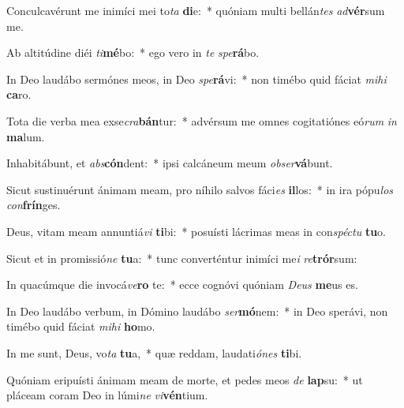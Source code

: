\item Conculcavérunt me inimíci mei to\textit{ta} \textbf{di}e:~* quóniam multi bellán\textit{tes} \textit{ad}\textbf{vér}sum me.
\item Ab altitúdine diéi \textit{ti}\textbf{mé}bo:~* ego vero in \textit{te} \textit{spe}\textbf{rá}bo.
\item In Deo laudábo sermónes meos, in Deo \textit{spe}\textbf{rá}vi:~* non timébo quid fáciat \textit{mi}\textit{hi} \textbf{ca}ro.
\item Tota die verba mea exse\textit{cra}\textbf{bán}tur:~* advérsum me omnes cogitatiónes eó\textit{rum} \textit{in} \textbf{ma}lum.
\item Inhabitábunt, et \textit{abs}\textbf{cón}dent:~* ipsi calcáneum meum \textit{ob}\textit{ser}\textbf{vá}bunt.
\item Sicut sustinuérunt ánimam meam, pro níhilo salvos fáci\textit{es} \textbf{il}los:~* in ira pópu\textit{los} \textit{con}\textbf{frín}ges.
\item Deus, vitam meam annuntiá\textit{vi} \textbf{ti}bi:~* posuísti lácrimas meas in con\textit{spéc}\textit{tu} \textbf{tu}o.
\item Sicut et in promissió\textit{ne} \textbf{tu}a:~* tunc converténtur inimíci me\textit{i} \textit{re}\textbf{trór}sum:
\item In quacúmque die invocá\textit{ve}\textbf{ro} te:~* ecce cognóvi quóniam \textit{De}\textit{us} \textbf{me}us es.
\item In Deo laudábo verbum, in Dómino laudábo \textit{ser}\textbf{mó}nem:~* in Deo sperávi, non timébo quid fáciat \textit{mi}\textit{hi} \textbf{ho}mo.
\item In me sunt, Deus, vo\textit{ta} \textbf{tu}a,~* quæ reddam, laudati\textit{ó}\textit{nes} \textbf{ti}bi.
\item Quóniam eripuísti ánimam meam de morte, et pedes meos \textit{de} \textbf{lap}su:~* ut pláceam coram Deo in lúmi\textit{ne} \textit{vi}\textbf{vén}tium.

